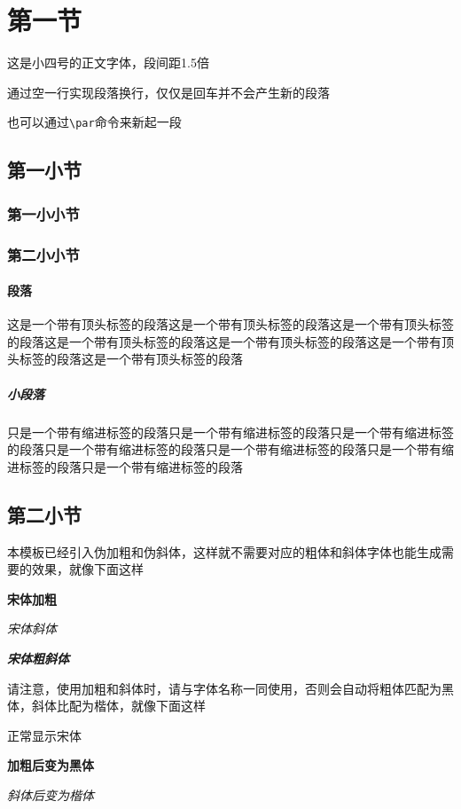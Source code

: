\documentclass{HustGraduPaper}
\begin{document}
	\clearpage%
	
	\section{第一节}
	这是小四号的正文字体，段间距1.5倍
	
	通过空一行实现段落换行，仅仅是回车并不会产生新的段落
	\par 也可以通过\verb|\par|命令来新起一段
	\subsection{第一小节}
	\subsubsection{第一小小节}
	\subsubsection{第二小小节}
	\paragraph{段落}这是一个带有顶头标签的段落这是一个带有顶头标签的段落这是一个带有顶头标签的段落这是一个带有顶头标签的段落这是一个带有顶头标签的段落这是一个带有顶头标签的段落这是一个带有顶头标签的段落
	\subparagraph{小段落}只是一个带有缩进标签的段落只是一个带有缩进标签的段落只是一个带有缩进标签的段落只是一个带有缩进标签的段落只是一个带有缩进标签的段落只是一个带有缩进标签的段落只是一个带有缩进标签的段落
	\subsection{第二小节}
	本模板已经引入伪加粗和伪斜体，这样就不需要对应的粗体和斜体字体也能生成需要的效果，就像下面这样
	
	{\songti \bfseries 宋体加粗}
	
	{\songti \itshape 宋体斜体}
	
	{\songti \bfseries \itshape 宋体粗斜体}
	
	请注意，使用加粗和斜体时，请与字体名称一同使用，否则会自动将粗体匹配为黑体，斜体比配为楷体，就像下面这样
	
	{正常显示宋体}
	
	{\bfseries 加粗后变为黑体}
	
	{\itshape 斜体后变为楷体}
	
\end{document}
